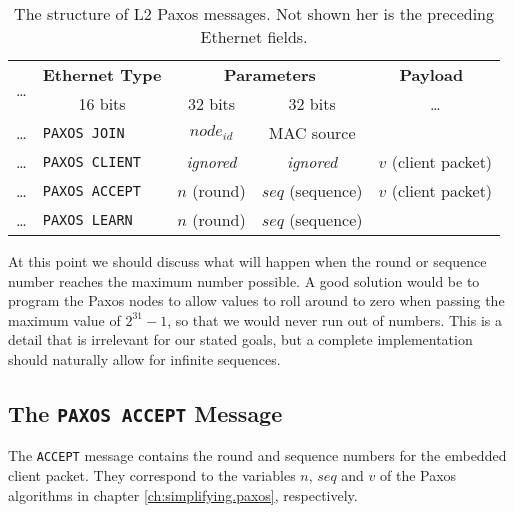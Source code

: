 \begin{table}[H]
  \centering
  \begin{tabular}{l|l|c|c|c|}
    \hline
      \multirow{2}{*}{\dots} &
      \multicolumn{1}{c|}{\textbf{Ethernet Type}} &
      \multicolumn{2}{c|}{\textbf{Parameters}} &
      \textbf{Payload} \\

      &
      \multicolumn{1}{c|}{16 bits} &
      \multicolumn{1}{c}{32 bits} &
      \multicolumn{1}{c|}{32 bits} &
      \dots \\

    \hline
      \dots & \texttt{PAXOS JOIN}   & $node_{id}$ & MAC source &
        \multicolumn{1}{c}{} \\

    \hline
      \dots & \texttt{PAXOS CLIENT} & \textit{ignored} & \textit{ignored} &
          $v$ (client packet) \\

    \hline
      \dots & \texttt{PAXOS ACCEPT} & $n$ (round) & $seq$ (sequence) &
          $v$ (client packet) \\

    \hline
      \dots & \texttt{PAXOS LEARN}  & $n$ (round) & $seq$ (sequence) &
          \multicolumn{1}{c}{} \\

    \cline{1-4}
  \end{tabular}

  \caption{The structure of \acs{L2} Paxos messages.  Not shown her is
           the preceding Ethernet fields.}
  \label{table:paxos.ethernet.packet}
\end{table}

At this point we should discuss what will happen when the round or sequence
number reaches the maximum number possible.
%
A good solution would be to program the Paxos nodes to allow values to
roll around to zero when passing the maximum value of $2^{31}-1$, so that
we would never run out of numbers.
%
This is a detail that is irrelevant for our stated goals, but a complete
implementation should naturally allow for infinite sequences.

\subsection{The \texttt{PAXOS ACCEPT} Message}
\label{chapter:paxos.accept.message}

The \texttt{ACCEPT} message contains the round and sequence numbers for the
embedded client packet.  They correspond to the variables $n$, $seq$ and
$v$ of the Paxos algorithms in chapter \vref{ch:simplifying.paxos},
respectively.

